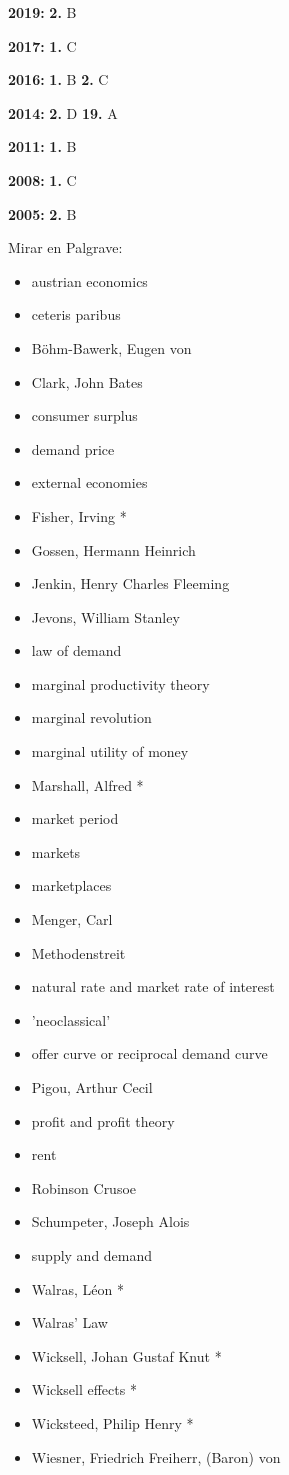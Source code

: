 \documentclass{nuevotema}
\begin{document}
\notas

\textbf{2019:} \textbf{2.} B

\textbf{2017:} \textbf{1.} C

\textbf{2016:} \textbf{1.} B \textbf{2.} C

\textbf{2014:} \textbf{2.} D \textbf{19.} A

\textbf{2011:} \textbf{1.} B

\textbf{2008:} \textbf{1.} C

\textbf{2005:} \textbf{2.} B

\bibliografia

Mirar en Palgrave:
\begin{itemize}
	\item austrian economics
	\item ceteris paribus
	\item Böhm-Bawerk, Eugen von
	\item Clark, John Bates
	\item consumer surplus
	\item demand price
	\item external economies
	\item Fisher, Irving *
	\item Gossen, Hermann Heinrich
	\item Jenkin, Henry Charles Fleeming
	\item Jevons, William Stanley
	\item law of demand
	\item marginal productivity theory
	\item marginal revolution
	\item marginal utility of money
	\item Marshall, Alfred *
	\item market period
	\item markets
	\item marketplaces
	\item Menger, Carl
	\item Methodenstreit
	\item natural rate and market rate of interest
	\item 'neoclassical'
	\item offer curve or reciprocal demand curve
	\item Pigou, Arthur Cecil
	\item profit and profit theory
	\item rent
	\item Robinson Crusoe
	\item Schumpeter, Joseph Alois
	\item supply and demand
	\item Walras, Léon *
	\item Walras' Law
	\item Wicksell, Johan Gustaf Knut *
	\item Wicksell effects *
	\item Wicksteed, Philip Henry *
	\item Wiesner, Friedrich Freiherr, (Baron) von
\end{itemize}
\end{document}
